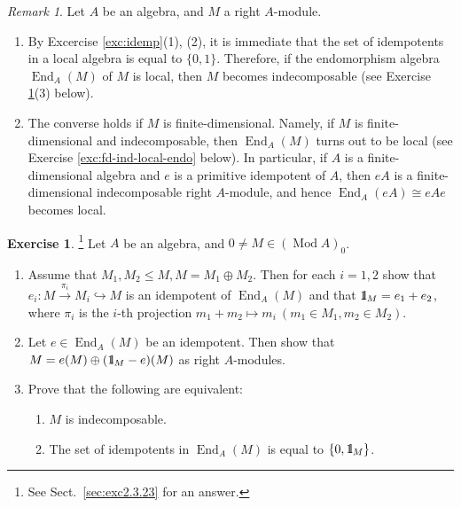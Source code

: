 \documentclass{surv-l}
\numberwithin{equation}{chapter}
\numberwithin{figure}{chapter}
\theoremstyle{plain}
\theoremstyle{definition}
\newtheorem{exc}[thm]{Exercise}
\theoremstyle{remark}
\newtheorem{rmk}[thm]{Remark}
\newcommand{\id}{1\kern-.25em{\text{{\rm l}}}}
\DeclareMathOperator{\End}{End}
\DeclareMathOperator{\Mod}{Mod}
\begin{document}
\begin{rmk}\label{rmk:primitive-local}
Let $A$ be an algebra, and $M$ a right $A$-module.
\begin{enumerate}
\item
By Excercise \ref{exc:idemp}(1), (2), it is immediate that
the set of idempotents in a local algebra is equal to $\{0, 1\}$.
Therefore, if the endomorphism algebra $\End_A(M)$ of $M$ is
local, then
$M$ becomes indecomposable
(see Exercise \ref{exc:endo0-1--indecomp}(3) below).
\item
The converse holds if $M$ is finite-dimensional.
Namely, if $M$ is finite-dimensional and indecomposable,
then $\End_A(M)$ turns out to be local
(see Exercise  \ref{exc:fd-ind-local-endo} below).
In particular, if $A$ is a finite-dimensional algebra and
$e$ is a primitive idempotent of $A$, then
$eA$ is a finite-dimensional indecomposable right $A$-module, and hence
$\End_A(eA) \cong eAe$ becomes local.
\end{enumerate}
\end{rmk}

\begin{exc}\hspace{-1.2ex}\footnote{See Sect.\ \ref{sec:exc2.3.23} for an answer.}
\label{exc:endo0-1--indecomp}\label{ex:2.3.23}
Let $A$ be an algebra, and $0 \ne M \in (\Mod A)_0$.
\begin{enumerate}
\item
Assume that $M_1, M_2 \le M, M = M_1 \oplus M_2$.
Then for each $i = 1,2$ show that
$e_i \colon M \xrightarrow{\pi_i} M_i \hookrightarrow M$
is an idempotent of $\End_A(M)$ and that
$\id_M = e_1 +e_2$, where
$\pi_i$ is the $i$-th projection
$m_1+m_2 \mapsto m_i\ (m_1 \in M_1, m_2 \in M_2)$.
\item
Let $e \in \End_A(M)$ be an idempotent.
Then show that $M = e(M) \oplus (\id_M -e)(M)$
as right $A$-modules.
\item
Prove that the following are equivalent:
\begin{enumerate}
\item
$M$ is indecomposable.
\item
The set of idempotents in $\End_A(M)$ is equal to $\{0, \id_M\}$.
\end{enumerate}
\end{enumerate}
\end{exc}
\end{document}
